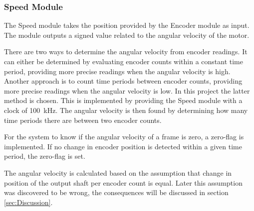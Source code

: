 \documentclass[../../main.tex]{subfiles}
\begin{document}



\subsubsection*{Speed Module}
The Speed module takes the position provided by the Encoder module as input. The module outputs a signed value related to the angular velocity of the motor. 

There are two ways to determine the angular velocity from encoder readings. It can either be determined by evaluating encoder counts within a constant time period, providing more precise readings when the angular velocity is high. Another approach is to count time periods between encoder counts, providing more precise readings when the angular velocity is low. In this project the latter method is chosen. This is implemented by providing the Speed module with a clock of \SI{100}{\kilo \hertz}. The angular velocity is then found by determining how many time periods there are between two encoder counts.

For the system to know if the angular velocity of a frame is zero, a zero-flag is implemented. If no change in encoder position is detected within a given time period, the zero-flag is set.

The angular velocity is calculated based on the assumption that change in position of the output shaft per encoder count is equal. Later this assumption was discovered to be wrong, the consequences will be discussed in section \ref{sec:Discussion}.



 
\end{document}
